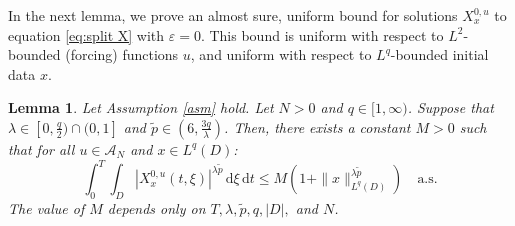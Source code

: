 \documentclass{amsart}
\theoremstyle{plain}
\theoremstyle{remark}
\theoremstyle{plain}
\newtheorem{lemma}[theorem]{Lemma}
\numberwithin{equation}{section}
\newcommand{\eps}{\varepsilon}
\newcommand{\A}{{\mathcal A}}
\newcommand{\dd}{\,\mathrm{d}}
\begin{document}
In the next lemma, we prove an almost sure, uniform  bound for solutions $X_x^{0,u}$ to equation \eqref{eq:split X} with $\eps=0$. 
This bound is uniform with respect to $L^2$-bounded (forcing) functions $u$, and uniform with respect to $L^q$-bounded initial data $x$. 

 
\begin{lemma} 
\label{lem:conv Linfty} Let Assumption \ref{asm} hold. Let $N>0$ and $q\in[1,\infty)$. 
  Suppose that $\lambda\in [0,\frac{q}{2})\cap (0,1]$ and $\tilde p\in (6,\frac{3q}{\lambda})$. 
  Then, there exists a constant $M>0$ such that for all $u\in\A_N$ and  $x\in L^q(D)$: 
  \begin{equation}\label{eq:toshow}
\int_0^T\int_D  |X_x^{0,u}(t,\xi)|^{\lambda \tilde p}\dd\xi\dd t \leq M(1+\|x\|_{L^q(D)}^{\lambda \tilde p}) \quad\text{a.s.}
  \end{equation}
  The value of $M$ depends only on $T,\lambda,\tilde p,q,|D|,$ and $N$.
\end{lemma} 
\end{document}
